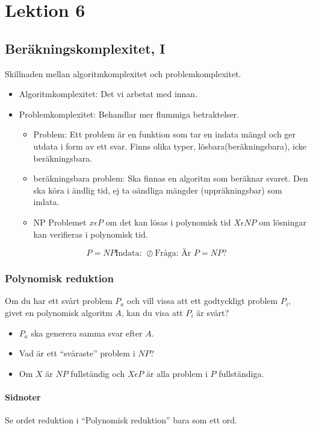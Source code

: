\section{Lektion 6}

\subsection{Beräkningskomplexitet, I}
Skillnaden mellan algoritmkomplexitet och problemkomplexitet.\\

\begin{itemize}
\item{Algoritmkomplexitet:
    Det vi arbetat med innan.
  }
\item{Problemkomplexitet:
    Behandlar mer flummiga betraktelser. \\
    \begin{itemize}
      \item{Problem: Ett problem är en funktion som tar en indata mängd och ger
          utdata i form av ett svar. Finns olika typer, lösbara(beräkningsbara),
          icke beräkningsbara.}
      \item{beräkningsbara problem: Ska finnas en algoritm som beräknar svaret.
          Den ska köra i ändlig tid, ej ta oändliga mängder (uppräkningsbar) som
          indata. }
      \item{NP
          Problemet \(x\epsilon P\) om det kan lösas i polynomisk tid \(X
          \epsilon NP\) om lösningar kan verifieras i polynomisk tid.
        }
    \end{itemize}
  }
\end{itemize}

\begin{equation}
  P = NP
  \text{Indata: } \oslash
  \text{Fråga: Är } P = NP \text{?}
\end{equation}

\subsubsection{Polynomisk reduktion}
Om du har ett svårt problem \(P_a\) och vill vissa att ett godtyckligt problem
\(P_i\), givet en polynomisk algoritm $A$, kan du visa att \(P_i\) är svårt?
\begin{itemize}
\item{\(P_a\) ska generera samma svar efter $A$.}
\item{Vad är ett ``svåraste'' problem i \(NP\)?\\
    
  }
\item{Om \(X\) är \(NP\) fullständig och \(X \epsilon P\) är alla problem i
    \(P\) fullständiga.}
\end{itemize}

\paragraph{Sidnoter}
Se ordet reduktion i ``Polynomisk reduktion'' bara som ett ord.
